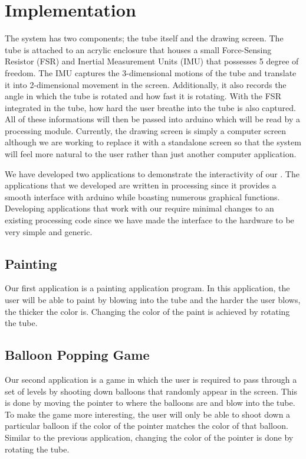 \section{Implementation}

The \tube system has two components; the tube itself and the drawing screen. The tube is attached to an acrylic enclosure that houses a small Force-Sensing Resistor (FSR) and Inertial Measurement Units (IMU) that possesses 5 degree of freedom. The IMU captures the 3-dimensional motions of the tube and translate it into 2-dimensional movement in the screen. Additionally, it also records the angle in which the tube is rotated and how fast it is rotating. With the FSR integrated in the tube, how hard the user breathe into the tube is also captured. All of these informations will then be passed into arduino which will be read by a processing module. Currently, the drawing screen is simply a computer screen although we are working to replace it with a standalone screen so that the \tube system will feel more natural to the user rather than just another computer application.

We have developed two applications to demonstrate the interactivity of our \tube. The applications that we developed are written in processing since it provides a smooth interface with arduino while boasting numerous graphical functions. Developing applications that work with our \tube require minimal changes to an existing processing code since we have made the interface to the hardware to be very simple and generic.

\subsection{Painting}
Our first application is a painting application program. In this application, the user will be able to paint by blowing into the tube and the harder the user blows, the thicker the color is. Changing the color of the paint is achieved by rotating the tube.

\subsection{Balloon Popping Game}
Our second application is a game in which the user is required to pass through a set of levels by shooting down balloons that randomly appear in the screen. This is done by moving the pointer to where the balloons are and blow into the tube. To make the game more interesting, the user will only be able to shoot down a particular balloon if the color of the pointer matches the color of that balloon. Similar to the previous application, changing the color of the pointer is done by rotating the tube.
